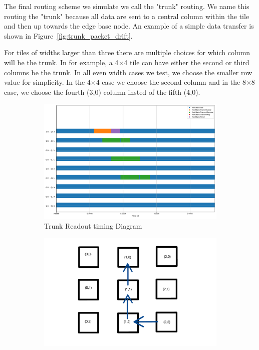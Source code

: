 The final routing scheme we simulate we call the "trunk" routing.
We name this routing the "trunk" because all data are sent to a central column within the tile and then up towards the edge base node.
An example of a simple data transfer is shown in Figure~\ref{fig:trunk_packet_drift}.

For tiles of widths larger than three there are multiple choices for which column will be the trunk.
In for example, a 4$\times$4 tile can have either the second or third columns be the trunk.
In all even width cases we test, we choose the smaller row value for simplicity.
In the 4$\times$4 case we choose the second column and in the 8$\times$8 case, we choose the fourth (3,0) column insted of the fifth (4,0).

\begin{figure}
\centering
\begin{subfigure}{.5\textwidth}
  \centering
  \includegraphics[width=\textwidth]{images/trunk_timer.pdf}
  \caption{Trunk Readout timing Diagram}
\end{subfigure}%
\begin{subfigure}{.5\textwidth}
  \centering
  \includegraphics[width=\textwidth]{images/trunk_ex_read.pdf}

\end{subfigure}
\end{figure}

